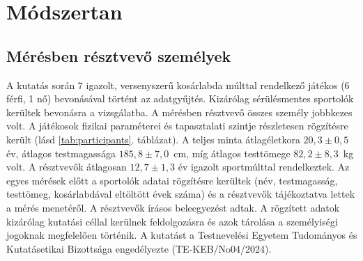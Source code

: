\chapter{Módszertan}
\label{ch:modszer}

\section{Mérésben résztvevő személyek}
A kutatás során 7 igazolt, versenyszerű kosárlabda múlttal rendelkező játékos (6 férfi, 1 nő) bevonásával történt az adatgyűjtés. Kizárólag sérülésmentes sportolók kerültek bevonásra a vizsgálatba. A mérésben résztvevő összes személy jobbkezes volt. A játékosok fizikai paraméterei és tapasztalati szintje részletesen rögzítésre került (lásd \ref{tab:participants}. táblázat). A teljes minta átlagéletkora $20{,}3 \pm 0{,}5$ év, átlagos testmagassága $185{,}8 \pm 7{,}0$~cm, míg átlagos testtömege $82{,}2 \pm 8{,}3$~kg volt. A résztvevők átlagosan $12{,}7 \pm 1{,}3$ év igazolt sportmúlttal rendelkeztek. Az egyes mérések előtt a sportolók adatai rögzítésre kerültek (név, testmagasság, testtömeg, kosárlabdával eltöltött évek száma) és a résztvevők tájékoztatva lettek a mérés menetéről. A résztvevők írásos beleegyezést adtak. A rögzített adatok kizárólag kutatási céllal kerülnek feldolgozásra és azok tárolása a személyiségi jogoknak megfelelően történik. A kutatást a Testnevelési Egyetem Tudományos és Kutatásetikai Bizottsága engedélyezte (TE-KEB/No04/2024).

